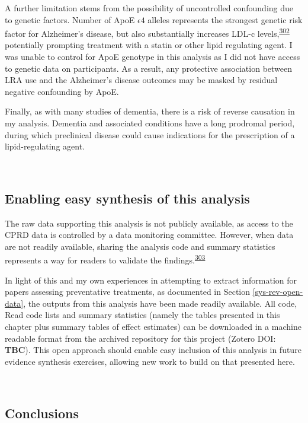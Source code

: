\documentclass[a4paper, twoside]{templates/ociamthesis}
\begin{document}
A further limitation stems from the possibility of uncontrolled confounding due to genetic factors. Number of ApoE \(\epsilon4\) alleles represents the strongest genetic risk factor for Alzheimer's disease, but also substantially increases LDL-c levels,\textsuperscript{\protect\hyperlink{ref-bennet2007}{302}} potentially prompting treatment with a statin or other lipid regulating agent. I was unable to control for ApoE genotype in this analysis as I did not have access to genetic data on participants. As a result, any protective association between LRA use and the Alzheimer's disease outcomes may be masked by residual negative confounding by ApoE.

Finally, as with many studies of dementia, there is a risk of reverse causation in my analysis. Dementia and associated conditions have a long prodromal period, during which preclinical disease could cause indications for the prescription of a lipid-regulating agent.

~

\hypertarget{cprd-data-avail}{%
\subsection{Enabling easy synthesis of this analysis}\label{cprd-data-avail}}

The raw data supporting this analysis is not publicly available, as access to the CPRD data is controlled by a data monitoring committee. However, when data are not readily available, sharing the analysis code and summary statistics represents a way for readers to validate the findings.\textsuperscript{\protect\hyperlink{ref-goldacre2019c}{303}}

In light of this and my own experiences in attempting to extract information for papers assessing preventative treatments, as documented in Section \ref{sys-rev-open-data}, the outputs from this analysis have been made readily available. All code, Read code lists and summary statistics (namely the tables presented in this chapter plus summary tables of effect estimates) can be downloaded in a machine readable format from the archived repository for this project (Zotero DOI: \textbf{TBC}). This open approach should enable easy inclusion of this analysis in future evidence synthesis exercises, allowing new work to build on that presented here.

~

\hypertarget{conclusions-1}{%
\subsection{Conclusions}\label{conclusions-1}}
\end{document}
